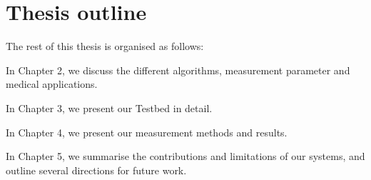 \section{Thesis outline}
\label{sec:intro:outline}

The rest of this thesis is organised as follows:

\begin{compactitem}
  \item In Chapter 2, we discuss the different algorithms, measurement parameter and medical applications.
  \item In Chapter 3, we present our Testbed in detail.
  \item In Chapter 4, we present our measurement methods and results.
  \item In Chapter 5, we summarise the contributions and limitations of our systems, and outline several directions for future work.
\end{compactitem}
